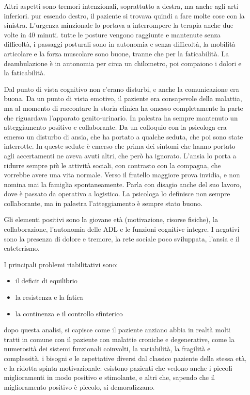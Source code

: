 Altri aspetti sono tremori intenzionali, soprattutto a destra, ma anche agli 
arti inferiori. pur essendo destro, il paziente si trovava quindi a fare molte 
cose con la sinistra. L'urgenza minzionale lo portava a interrompere la terapia 
anche due volte in 40 minuti. tutte le posture vengono raggiunte e mantenute 
senza difficoltà, i passaggi posturali sono in autonomia e senza difficoltà, 
la mobilità articolare e la forza muscolare sono buone, tranne che per la 
faticabilità. La deambulazione è in autonomia per circa un chilometro, poi 
compaiono i dolori e la faticabilità.

Dal punto di vista cognitivo non c'erano disturbi, e anche la comunicazione era 
buona. Da un punto di vista emotivo, il paziente era consapevole della 
malattia, ma al momento di raccontare la storia clinica ha omesso completamente 
la parte che riguardava l'apparato genito-urinario. In palestra ha sempre 
mantenuto un atteggiamento positivo e collaborante. Da un colloquio con la 
psicologa era emerso un disturbo di ansia, che ha portato a qualche seduta, che 
poi sono state interrotte. In queste sedute è emerso che prima dei sintomi che 
hanno portato agli accertamenti ne aveva avuti altri, che però ha ignorato. 
L'ansia lo porta a ridurre sempre più le attività sociali, con contrasto con 
la compagna, che vorrebbe avere una vita normale. Verso il fratello maggiore prova 
invidia, e non nomina mai la famiglia spontaneamente. Parla con disagio anche 
del suo lavoro, dove è passato da operativo a logistico. La psicologa lo 
definisce non sempre collaborante, ma in palestra l'atteggiamento è sempre 
stato buono.

Gli elementi positivi sono la giovane età (motivazione, risorse fisiche), la 
collaborazione, l'autonomia delle ADL e le funzioni cognitive integre. I 
negativi sono la presenza di dolore e tremore, la rete sociale poco sviluppata, 
l'ansia e il cateterismo.

I principali problemi riabilitativi sono:
\begin{itemize}
\item il deficit di equilibrio
\item la resistenza e la fatica
\item la continenza e il controllo sfinterico
\end{itemize}
dopo questa analisi, si capisce come il paziente anziano abbia in realtà molti 
tratti in comune con il paziente con malattie croniche e degenerative, come la 
numerosità dei sistemi funzionali coinvolti, la variabilità, la fragilità e 
complessità, i bisogni e le aspettative diversi dal classico paziente della 
stessa età, e la ridotta spinta motivazionale: esistono pazienti che vedono 
anche i piccoli miglioramenti in modo positivo e stimolante, e altri che, 
sapendo che il miglioramento positivo è piccolo, si demoralizzano.

